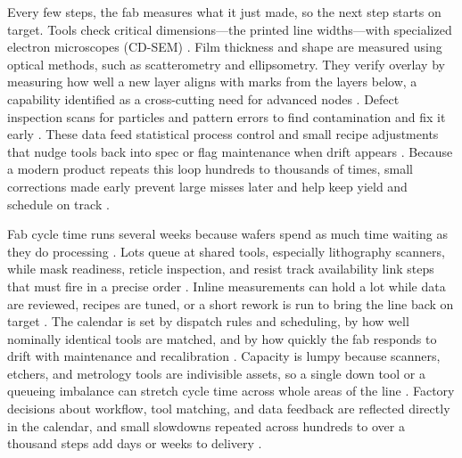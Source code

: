 Every few steps, the fab measures what it just made, so the next step starts on target. Tools check critical dimensions---the printed line widths---with specialized electron microscopes (CD-SEM) \parencite{diebold_handbook_2001,irds_metrology_technical_working_group_international_2023}. Film thickness and shape are measured using optical methods, such as scatterometry and ellipsometry. They verify overlay by measuring how well a new layer aligns with marks from the layers below, a capability identified as a cross-cutting need for advanced nodes \parencite{irds_metrology_technical_working_group_international_2023}. Defect inspection scans for particles and pattern errors to find contamination and fix it early \parencite{diebold_handbook_2001}. These data feed statistical process control and small recipe adjustments that nudge tools back into spec or flag maintenance when drift appears \parencite{may_fundamentals_2006,irds_factory_integration_technical_working_group_international_2023}. Because a modern product repeats this loop hundreds to thousands of times, small corrections made early prevent large misses later and help keep yield and schedule on track \parencite{irds_factory_integration_technical_working_group_international_2023}.

Fab cycle time runs several weeks because wafers spend as much time waiting as they do processing \parencite{varas_strengthening_2021}. Lots queue at shared tools, especially lithography scanners, while mask readiness, reticle inspection, and resist track availability link steps that must fire in a precise order \parencite{irds_factory_integration_technical_working_group_international_2023}. Inline measurements can hold a lot while data are reviewed, recipes are tuned, or a short rework is run to bring the line back on target \parencite{may_fundamentals_2006}. The calendar is set by dispatch rules and scheduling, by how well nominally identical tools are matched, and by how quickly the fab responds to drift with maintenance and recalibration \parencite{irds_factory_integration_technical_working_group_international_2023}. Capacity is lumpy because scanners, etchers, and metrology tools are indivisible assets, so a single down tool or a queueing imbalance can stretch cycle time across whole areas of the line \parencite{varas_strengthening_2021}. Factory decisions about workflow, tool matching, and data feedback are reflected directly in the calendar, and small slowdowns repeated across hundreds to over a thousand steps add days or weeks to delivery \parencite{irds_factory_integration_technical_working_group_international_2023}.

